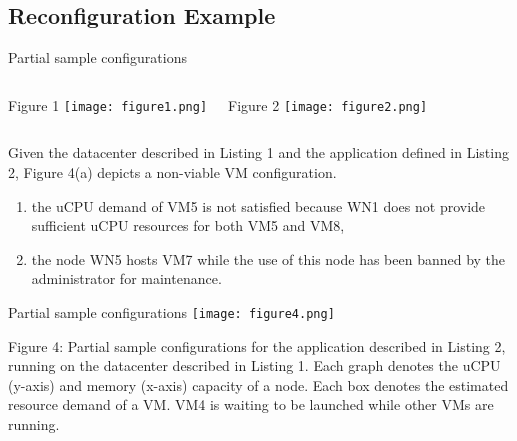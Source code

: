 \subsection{Reconfiguration Example} 
\begin{frame}{Partial sample configurations}

\begin{columns}[t]
\begin{block}{Figure 1}
\texttt{[image: figure1.png]}
\end{block}
\begin{block}{Figure 2}
\texttt{[image: figure2.png]}
\end{block}
\end{columns}
\pause{}
Given the datacenter described in Listing 1 and the application defined in Listing
2, Figure 4(a) depicts a non-viable VM configuration. 
\pause{}
\begin{enumerate}
\item the uCPU demand of VM5 is not satisfied because WN1 does not provide sufficient
uCPU resources for both VM5 and VM8, 
\pause{}
\item the node WN5 hosts VM7 while the use
of this node has been banned by the administrator for maintenance.
\end{enumerate}

\end{frame}
\begin{frame}{Partial sample configurations}
\texttt{[image: figure4.png]}

Figure 4: Partial sample configurations for the application described in Listing
 2, running on the datacenter described in Listing 1. Each graph denotes the
uCPU (y-axis) and memory (x-axis) capacity of a node. Each box denotes the
estimated resource demand of a VM. VM4 is waiting to be launched while other
VMs are running.
\end{frame}

